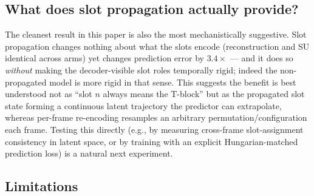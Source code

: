 \documentclass[12pt]{article}
\begin{document}
\subsection{What does slot propagation actually provide?}

The cleanest result in this paper is also the most mechanistically suggestive. Slot propagation changes nothing about what the slots encode (reconstruction and SU identical across arms) yet changes prediction error by $3.4\times$ --- and it does so \emph{without} making the decoder-visible slot roles temporally rigid; indeed the non-propagated model is more rigid in that sense. This suggests the benefit is best understood not as ``slot $n$ always means the T-block'' but as the propagated slot state forming a continuous latent trajectory the predictor can extrapolate, whereas per-frame re-encoding resamples an arbitrary permutation/configuration each frame. Testing this directly (e.g., by measuring cross-frame slot-assignment consistency in latent space, or by training with an explicit Hungarian-matched prediction loss) is a natural next experiment.

\subsection{Limitations}
\end{document}
